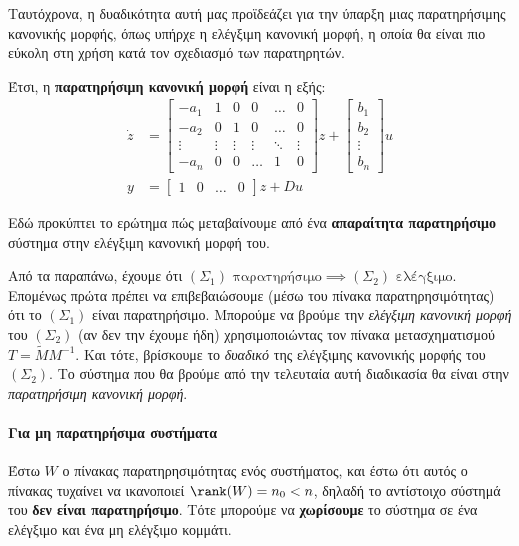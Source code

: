\documentclass[11pt,a4paper,notitlepage,fleqn]{article}
\begin{document}
Ταυτόχρονα, η δυαδικότητα αυτή μας προϊδεάζει για την ύπαρξη μιας
παρατηρήσιμης κανονικής μορφής, όπως υπήρχε η ελέγξιμη κανονική μορφή, η
οποία θα είναι πιο εύκολη στη χρήση κατά τον σχεδιασμό των παρατηρητών.

Έτσι, η \textbf{παρατηρήσιμη κανονική μορφή} είναι η εξής:
\begin{align*}
	\dot z &= \left[\begin{matrix}
	-a_1 & 1 & 0 &0& \dots & 0\\
	-a_2 & 0 & 1 & 0& \dots & 0\\
	\vdots & \vdots & \vdots &\vdots & \ddots & \vdots \\
	-a_n & 0 & 0 & \dots & 1 & 0
	\end{matrix}\right]z + \left[\begin{matrix}
	b_1 \\ b_2 \\ \vdots \\ b_n
	\end{matrix}\right]u\\
	y &= \left[\begin{matrix}
	1 & 0 & \dots & 0
	\end{matrix}\right]z + Du
\end{align*}

Εδώ προκύπτει το ερώτημα πώς μεταβαίνουμε από ένα \textbf{απαραίτητα παρατηρήσιμο} σύστημα στην ελέγξιμη κανονική μορφή του.

Από τα παραπάνω, έχουμε ότι \( (Σ_1) \text{ παρατηρήσιμο} \implies
(Σ_2)\text{ ελέγξιμο} \). Επομένως πρώτα πρέπει να επιβεβαιώσουμε (μέσω
του πίνακα παρατηρησιμότητας) ότι το \( (Σ_1) \) είναι
παρατηρήσιμο. Μπορούμε να βρούμε την \textit{ελέγξιμη κανονική
μορφή} του \( (Σ_2) \) (αν δεν την έχουμε ήδη) χρησιμοποιώντας τον πίνακα μετασχηματισμού
\( T = \tilde M M^{-1} \). Και τότε, βρίσκουμε το \textit{δυαδικό} της
ελέγξιμης κανονικής μορφής του \( (Σ_2) \). Το σύστημα που θα βρούμε
από την τελευταία αυτή διαδικασία θα είναι στην \textit{παρατηρήσιμη κανονική μορφή}.

\paragraph{Για μη παρατηρήσιμα συστήματα}
Έστω \( W \) ο πίνακας παρατηρησιμότητας ενός συστήματος, και έστω ότι
αυτός ο πίνακας τυχαίνει να ικανοποιεί \( \rank(W) = n_0 < n \), δηλαδή
το αντίστοιχο σύστημά του \textbf{δεν είναι παρατηρήσιμο}. Τότε μπορούμε
να \textbf{χωρίσουμε} το σύστημα σε ένα ελέγξιμο και ένα μη ελέγξιμο κομμάτι.
\end{document}
